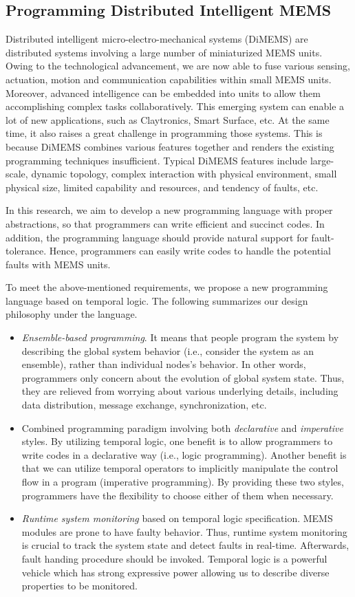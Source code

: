 \subsection{Programming Distributed Intelligent MEMS}

Distributed intelligent micro-electro-mechanical systems (DiMEMS) are distributed systems involving a large number of miniaturized MEMS units. Owing to the technological advancement, we are now able to fuse various sensing, actuation, motion and communication capabilities within small MEMS units. Moreover, advanced intelligence can be embedded into units to allow them accomplishing complex tasks collaboratively. This emerging system can enable a lot of new applications, such as Claytronics, Smart Surface, etc. At the same time, it also raises a great challenge in programming those systems. This is because DiMEMS combines various features together and renders the existing programming techniques insufficient. Typical DiMEMS features include large-scale, dynamic topology, complex interaction with physical environment, small physical size, limited capability and resources, and tendency of faults, etc.

In this research, we aim to develop a new programming language with proper abstractions, so that programmers can write efficient and succinct codes. In addition, the programming language should provide natural support for fault-tolerance. Hence, programmers can easily write codes to handle the potential faults with MEMS units.

To meet the above-mentioned requirements, we propose a new programming language based on temporal logic. The following summarizes our design philosophy under the language.

\begin{itemize}
  \item \emph{Ensemble-based programming}. It means that people program the system by describing the global system behavior (i.e., consider the system as an ensemble), rather than individual nodes's behavior. In other words, programmers only concern
about the evolution of global system state. Thus, they are relieved from worrying about various underlying details, including data distribution, message exchange, synchronization, etc.
  \item Combined programming paradigm involving both \emph{declarative} and \emph{imperative} styles. By utilizing temporal logic, one benefit is to allow  programmers to write codes in a declarative way (i.e., logic programming). Another benefit is that we can utilize temporal operators to implicitly manipulate the control flow in a program (imperative programming). By providing these two styles, programmers have the flexibility to choose either of them when necessary.
  \item \emph{Runtime system monitoring} based on temporal logic specification. MEMS modules are prone to have faulty behavior. Thus, runtime system monitoring is crucial to track the system state and detect faults in real-time. Afterwards, fault handing procedure should be invoked. Temporal logic is a powerful vehicle which has strong expressive power allowing us to describe diverse properties to be monitored.
\end{itemize}
